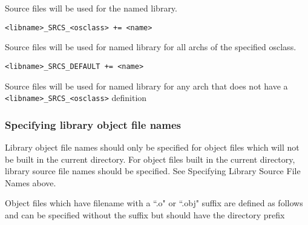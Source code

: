 \begin{description}
Source files will be used for the named library.

\item \verb|<libname>_SRCS_<osclass> += <name>|

Source files will be used for named library for all archs of the specified osclass.

\item \verb|<libname>_SRCS_DEFAULT += <name>|

Source files will be used for named library for any arch that does not have a \verb|<libname>_SRCS_<osclass>| 
definition

\end{description}

\subsubsection{Specifying library object file names}

Library object file names should only be specified for object files which will not be built in the current directory. For 
object files built in the current directory, library source file names should be specified. See Specifying Library Source File 
Names above.

Object files which have filename with a ``.o" or ``.obj" suffix are defined as follows and can be specified without the suffix 
but should have the directory prefix 

